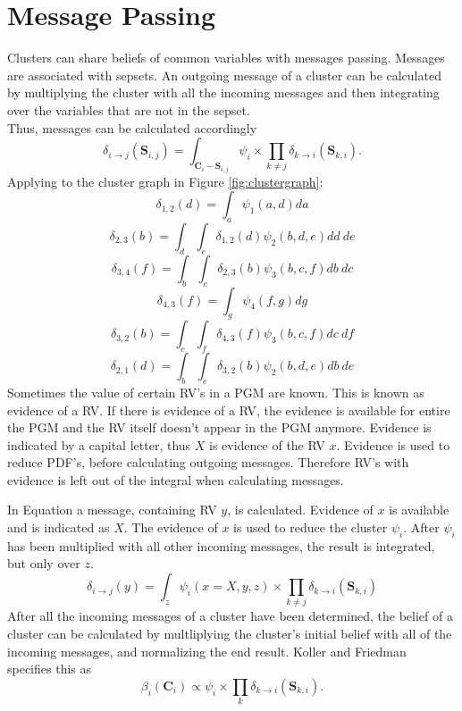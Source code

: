 \documentclass[12pt,oneside,openany,a4paper, %
afrikaans,english,
]{memoir}
\numberwithin{equation}{chapter}
\begin{document}
\section{Message Passing}
Clusters can share beliefs of common variables with messages passing. Messages are associated with sepsets. An outgoing message of a cluster can be calculated by multiplying the cluster with all the incoming messages and then integrating over the variables that are not in the sepset.
\\Thus, messages can be calculated accordingly~\citep{koller}
\begin{equation}
\delta_{i\to j}(\bm{S}_{i,j}) = \int_{\bm{C}_i - \bm{S}_{i,j}}\psi_i \times \prod_{k\ne j} \delta_{k\to i}(\bm{S}_{k,i}).
\end{equation}
Applying to the cluster graph in Figure \ref{fig:clustergraph}:
\begin{equation}\label{eq:del12}
\delta_{1,2}(d) = \int_a \psi_1(a,d)da
\end{equation}
\begin{equation}
\delta_{2,3}(b) = \int_d \int_e \delta_{1,2}(d)\psi_2(b,d,e)dd\ de
\end{equation}
\begin{equation}
\delta_{3,4}(f) = \int_b \int_c \delta_{2,3}(b)\psi_3(b,c,f)db\ dc
\end{equation}
\begin{equation}
\delta_{4,3}(f) = \int_g \psi_4(f,g)dg
\end{equation}
\begin{equation}
\delta_{3,2}(b) = \int_c \int_f \delta_{4,3}(f)\psi_3(b,c,f)dc\ df
\end{equation}
\begin{equation}
\delta_{2,1}(d) = \int_b \int_e \delta_{3,2}(b)\psi_2(b,d,e)db\ de
\end{equation}
Sometimes the value of certain RV's in a PGM are known. This is known as evidence of a RV. If there is evidence of a RV, the evidence is available for entire the PGM and the RV itself doesn't appear in the PGM anymore. Evidence is indicated by a capital letter, thus $X$ is evidence of the RV $x$. Evidence is used to reduce PDF's, before calculating outgoing messages. Therefore RV's with evidence is left out of the integral when calculating messages.

In Equation a message, containing RV $y$, is calculated. Evidence of $x$ is available and is indicated as $X$. The evidence of $x$ is used to reduce the cluster $\psi_i$. After $\psi_i$ has been multiplied with all other incoming messages, the result is integrated, but only over $z$.
\begin{equation}
\delta_{i\to j}(y) = \int_{z}\psi_i(x = X, y, z) \times \prod_{k\ne j} \delta_{k\to i}(\bm{S}_{k,i})
\end{equation}
After all the incoming messages of a cluster have been determined, the belief of a cluster can be calculated by multliplying the cluster's initial belief with all of the incoming messages, and normalizing the end result. Koller and Friedman~\cite{koller} specifies this as
\begin{equation}
\beta_i(\bm{C}_i) \propto \psi_i \times \prod_{k} \delta_{k \to i}(\bm{S}_{k,i}).
\end{equation}
\end{document}

